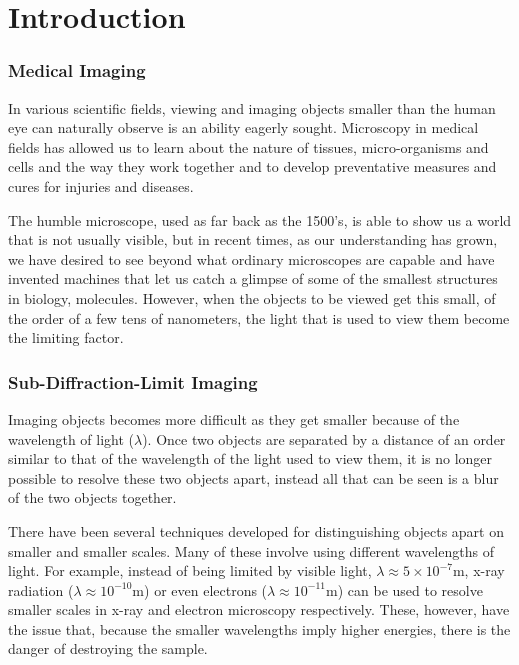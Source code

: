 \part{Introduction}

\section{Medical Imaging}
\label{sec:section_name}

In various scientific fields, viewing and imaging objects smaller than the human
eye can naturally observe is an ability eagerly sought. Microscopy in medical
fields has allowed us to learn about the nature of tissues, micro-organisms and
cells and the way they work together and to develop preventative measures and
cures for injuries and diseases.

The humble microscope, used as far back as the 1500's, is able to show us a
world that is not usually visible, but in recent times, as our understanding
has grown, we have desired to see beyond what ordinary microscopes are capable
and have invented machines that let us catch a glimpse of some of the smallest
structures in biology, molecules. However, when the objects to be viewed get
this small, of the order of a few tens of nanometers, the light that is used to
view them become the limiting factor.

\section{Sub-Diffraction-Limit Imaging}
\label{sec:sub_diffraction_limit_imaging}

Imaging objects becomes more difficult as they get smaller because of the
wavelength of light ($\lambda$). Once two objects are separated by a distance
of an order similar to that of the wavelength of the light used to view them,
it is no longer possible to resolve these two objects apart, instead all that
can be seen is a blur of the two objects together.

There have been several techniques developed for distinguishing objects apart
on smaller and smaller scales. Many of these involve using different
wavelengths of light.  For example, instead of being limited by visible light,
$\lambda \approx 5\times 10^{-7} \textrm{m}$, x-ray radiation ($\lambda \approx
10^{-10} \textrm{m}$) or even electrons ($\lambda \approx 10^{-11} \textrm{m}$)
can be used to resolve smaller scales in x-ray and electron microscopy
respectively. These, however, have the issue that, because the smaller
wavelengths imply higher energies, there is the danger of destroying the sample.


